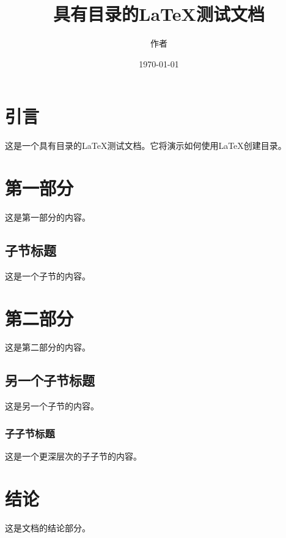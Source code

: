 \documentclass{article}
\begin{document}
\title{具有目录的LaTeX测试文档}
\author{作者}
\date{\today}

\maketitle

\tableofcontents %

\section{引言}
这是一个具有目录的LaTeX测试文档。它将演示如何使用LaTeX创建目录。

\section{第一部分}
这是第一部分的内容。

\subsection{子节标题}
这是一个子节的内容。

\section{第二部分}
这是第二部分的内容。

\subsection{另一个子节标题}
这是另一个子节的内容。

\subsubsection{子子节标题}
这是一个更深层次的子子节的内容。

\section{结论}
这是文档的结论部分。
\end{document}
